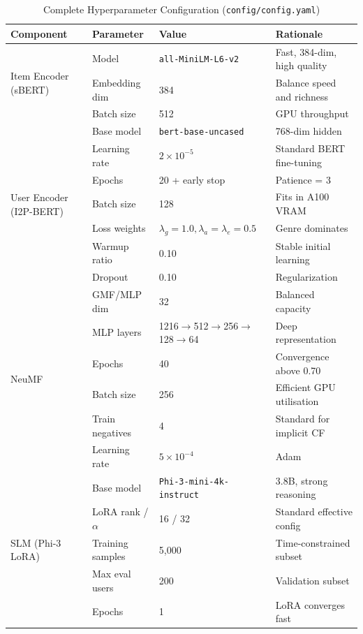 \documentclass[11pt,a4paper]{article}
\begin{document}
\begin{table}[H]
  \centering
  \caption{Complete Hyperparameter Configuration (\texttt{config/config.yaml})}
  \label{tab:hyperparams}
  \begin{tabular}{llll}
    \toprule
    \textbf{Component} & \textbf{Parameter} & \textbf{Value} & \textbf{Rationale} \\
    \midrule
    \multirow{3}{*}{Item Encoder (sBERT)}
      & Model & \texttt{all-MiniLM-L6-v2} & Fast, 384-dim, high quality \\
      & Embedding dim & 384 & Balance speed and richness \\
      & Batch size & 512 & GPU throughput \\
    \midrule
    \multirow{7}{*}{User Encoder (I2P-BERT)}
      & Base model & \texttt{bert-base-uncased} & 768-dim hidden \\
      & Learning rate & $2\times10^{-5}$ & Standard BERT fine-tuning \\
      & Epochs & 20 + early stop & Patience = 3 \\
      & Batch size & 128 & Fits in A100 VRAM \\
      & Loss weights & $\lambda_g=1.0, \lambda_a=\lambda_e=0.5$ & Genre dominates \\
      & Warmup ratio & 0.10 & Stable initial learning \\
      & Dropout & 0.10 & Regularization \\
    \midrule
    \multirow{6}{*}{NeuMF}
      & GMF/MLP dim & 32 & Balanced capacity \\
      & MLP layers & 1216$\to$512$\to$256$\to$128$\to$64 & Deep representation \\
      & Epochs & 40 & Convergence above 0.70 \\
      & Batch size & 256 & Efficient GPU utilisation \\
      & Train negatives & 4 & Standard for implicit CF \\
      & Learning rate & $5\times10^{-4}$ & Adam \\
    \midrule
    \multirow{5}{*}{SLM (Phi-3 LoRA)}
      & Base model & \texttt{Phi-3-mini-4k-instruct} & 3.8B, strong reasoning \\
      & LoRA rank / $\alpha$ & 16 / 32 & Standard effective config \\
      & Training samples & 5,000 & Time-constrained subset \\
      & Max eval users & 200 & Validation subset \\
      & Epochs & 1 & LoRA converges fast \\
    \bottomrule
  \end{tabular}
\end{table}
\end{document}

